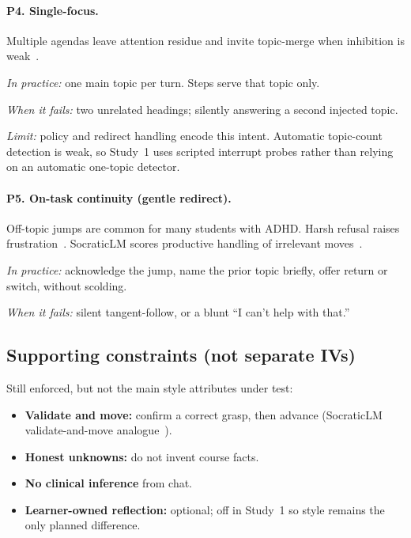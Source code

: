 \paragraph{P4. Single-focus.}
Multiple agendas leave attention residue and invite topic-merge when
inhibition is weak~\cite{sweller2011cognitive,zhu2026scaffolding,shani2024multiturn}.

\emph{In practice:} one main topic per turn. Steps serve that topic only.

\emph{When it fails:} two unrelated headings; silently answering a second
injected topic.

\emph{Limit:} policy and redirect handling encode this intent. Automatic
topic-count detection is weak, so Study~1 uses scripted interrupt probes
rather than relying on an automatic one-topic detector.

\paragraph{P5. On-task continuity (gentle redirect).}
Off-topic jumps are common for many students with ADHD. Harsh refusal raises
frustration~\cite{beheshti2020emotion,zhu2026scaffolding}. SocraticLM scores
productive handling of irrelevant moves~\cite{liu2024socraticlm}.

\emph{In practice:} acknowledge the jump, name the prior topic briefly, offer
return or switch, without scolding.

\emph{When it fails:} silent tangent-follow, or a blunt ``I can't help with
that.''

\subsection{Supporting constraints (not separate IVs)}

Still enforced, but not the main style attributes under test:
\begin{itemize}
  \item \textbf{Validate and move:} confirm a correct grasp, then advance
    (SocraticLM validate-and-move analogue~\cite{liu2024socraticlm}).
  \item \textbf{Honest unknowns:} do not invent course facts.
  \item \textbf{No clinical inference} from chat.
  \item \textbf{Learner-owned reflection:} optional; off in Study~1 so style
    remains the only planned difference.
\end{itemize}

